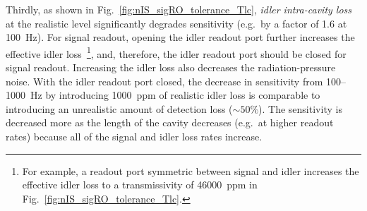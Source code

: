 Thirdly, as shown in Fig.~\ref{fig:nIS_sigRO_tolerance_Tlc}, \emph{idler intra-cavity loss} at the realistic level significantly degrades sensitivity (e.g.\ by a factor of 1.6 at 100~Hz). For signal readout, opening the idler readout port further increases the effective idler loss~\footnote{For example, a readout port symmetric between signal and idler increases the effective idler loss to a transmissivity of 46000~ppm in Fig.~\ref{fig:nIS_sigRO_tolerance_Tlc}.}, and, therefore, the idler readout port should be closed for signal readout. Increasing the idler loss also decreases the radiation-pressure noise. With the idler readout port closed, the decrease in sensitivity from 100--1000~Hz by introducing 1000~ppm of realistic idler loss is comparable to introducing an unrealistic amount of detection loss ($\sim50\%$). The sensitivity is decreased more as the length of the cavity decreases (e.g.\ at higher readout rates) because all of the signal and idler loss rates increase. 

